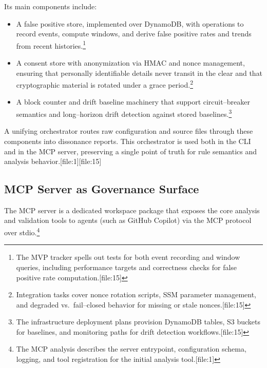 \documentclass[11pt]{article}
\begin{document}
Its main components include:
\begin{itemize}[leftmargin=*]
  \item A false positive store, implemented over DynamoDB, with operations to record events, compute windows, and derive false positive rates and trends from recent histories.\footnote{The MVP tracker spells out tests for both event recording and window queries, including performance targets and correctness checks for false positive rate computation.[file:15]} 
  \item A consent store with anonymization via HMAC and nonce management, ensuring that personally identifiable details never transit in the clear and that cryptographic material is rotated under a grace period.\footnote{Integration tasks cover nonce rotation scripts, SSM parameter management, and degraded vs.\ fail--closed behavior for missing or stale nonces.[file:15]} 
  \item A block counter and drift baseline machinery that support circuit--breaker semantics and long--horizon drift detection against stored baselines.\footnote{The infrastructure deployment plans provision DynamoDB tables, S3 buckets for baselines, and monitoring paths for drift detection workflows.[file:15]} 
\end{itemize}

A unifying orchestrator routes raw configuration and source files through these components into dissonance reports. This orchestrator is used both in the CLI and in the MCP server, preserving a single point of truth for rule semantics and analysis behavior.[file:1][file:15]

\subsection{MCP Server as Governance Surface}

The MCP server is a dedicated workspace package that exposes the core analysis and validation tools to agents (such as GitHub Copilot) via the MCP protocol over stdio.\footnote{The MCP analysis describes the server entrypoint, configuration schema, logging, and tool registration for the initial analysis tool.[file:1]}
\end{document}
